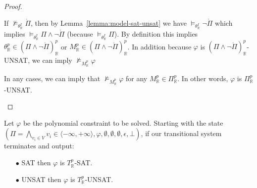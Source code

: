 \begin{proof}
\begin{enumerate}
\begin{itemize}
\begin{itemize}
If $\not\models_{\theta^I_\mathbb{R}} \mathring{\Pi}$, then by Lemma~\ref{lemma:model-sat-unsat} we have $\models_{\theta^I_\mathbb{R}} \neg\mathring{\Pi}$ which implies $\models_{\theta^I_\mathbb{R}} \Pi \wedge \neg\mathring{\Pi}$ (because $\models_{\theta^I_\mathbb{R}}\Pi$). By definition this implies $\theta^p_\mathbb{R} \in (\Pi \wedge \neg\mathring{\Pi})^p_\mathbb{R}$ or $M^p_\mathbb{R} \in (\Pi \wedge \neg\mathring{\Pi})^p_\mathbb{R}$. In addition because $\varphi$ is $(\Pi \wedge \neg\mathring{\Pi})^p_\mathbb{R}$-UNSAT, we can imply $\not\models_{M^p_\mathbb{R}}\varphi$

In any cases, we can imply that $\not\models_{M^p_\mathbb{R}}\varphi$ for any $M^p_\mathbb{R} \in \Pi^p_\mathbb{R}$. In other words, $\varphi$ is $\Pi^p_\mathbb{R}$-UNSAT.
\end{itemize}
\end{itemize}
\end{enumerate}
\end{proof}

\begin{theorem}
Let $\varphi$ be the polynomial constraint to be solved. Starting with the state $(\Pi = \bigwedge\limits_{v_i \in V} v_i \in \langle -\infty, +\infty \rangle, \varphi, \emptyset, \emptyset, \emptyset, \epsilon, \bot)$, if our transitional system terminates and output:
\begin{itemize}
\item[$\bullet$] SAT then $\varphi$ is $T^p_\mathbb{R}$-SAT.
\item[$\bullet$] UNSAT then $\varphi$ is $T^p_\mathbb{R}$-UNSAT.
\end{itemize}
\end{theorem}


